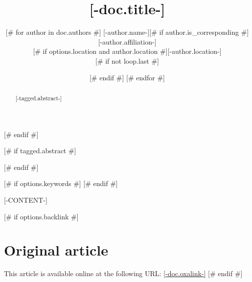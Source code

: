\documentclass{article}
\title{[-doc.title-]}
\date{\displaydate{articleDate}}
[# else #]
\date{}
[# endif #]
\author{[# for author in doc.authors #]
[-author.name-][# if author.is_corresponding #]\footnotemark[1][# endif #]\\
[# if options.affiliation and author.affiliation #][-author.affiliation-]\\[# endif #]
[# if options.location and author.location #][-author.location-]\\[# endif #]
[# if not loop.last #]
\and
[# endif #]
[# endfor #]
}
\begin{document}
[# endif #]

[# if tagged.abstract #]
\begin{abstract}
[-tagged.abstract-]
\end{abstract}
[# endif #]

[# if options.keywords #]
[# endif #]

[-CONTENT-]

[# if options.backlink #]
\section*{Original article}
\footnotesize
This article is available online at the following URL: \href{[-doc.oxalink-]}{[-doc.oxalink-]}
\normalsize
[# endif #]



\end{document}
